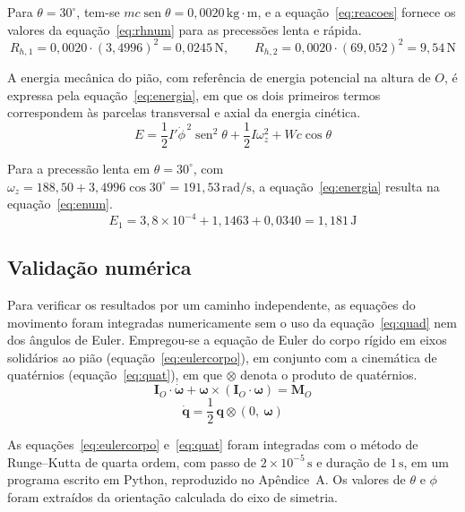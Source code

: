 \documentclass[12pt,a4paper]{article}
\newcommand{\vet}[1]{\mathbf{#1}}
\newcommand{\vomega}{\boldsymbol{\omega}}
\newcommand{\seno}{\operatorname{sen}}
\newcommand{\un}[1]{\,\mathrm{#1}}
\newcommand{\phid}{\dot{\phi}}
\begin{document}
Para $\theta=30^\circ$, tem-se $mc\seno\theta=0,0020\un{kg\cdot m}$, e a equação~\ref{eq:reacoes} fornece os valores da equação~\ref{eq:rhnum} para as precessões lenta e rápida.
\begin{equation}
R_{h,1}=0,0020\cdot(3,4996)^2=0,0245\un{N},
\qquad
R_{h,2}=0,0020\cdot(69,052)^2=9,54\un{N}
\label{eq:rhnum}
\end{equation}

A energia mecânica do pião, com referência de energia potencial na altura de $O$, é expressa pela equação~\ref{eq:energia}, em que os dois primeiros termos correspondem às parcelas transversal e axial da energia cinética.
\begin{equation}
E = \frac{1}{2}I'\phid^{\,2}\seno^2\theta + \frac{1}{2}I\omega_z^2 + Wc\cos\theta
\label{eq:energia}
\end{equation}

Para a precessão lenta em $\theta=30^\circ$, com $\omega_z=188,50+3,4996\cos30^\circ=191,53\un{rad/s}$, a equação~\ref{eq:energia} resulta na equação~\ref{eq:enum}.
\begin{equation}
E_1=3,8\times10^{-4}+1,1463+0,0340=1,181\un{J}
\label{eq:enum}
\end{equation}

\subsection{Validação numérica}

Para verificar os resultados por um caminho independente, as equações do movimento foram integradas numericamente sem o uso da equação~\ref{eq:quad} nem dos ângulos de Euler. Empregou-se a equação de Euler do corpo rígido em eixos solidários ao pião (equação~\ref{eq:eulercorpo}), em conjunto com a cinemática de quatérnios (equação~\ref{eq:quat}), em que $\otimes$ denota o produto de quatérnios.
\begin{equation}
\vet{I}_O\cdot\dot{\vomega} + \vomega\times\left(\vet{I}_O\cdot\vomega\right) = \vet{M}_O
\label{eq:eulercorpo}
\end{equation}
\begin{equation}
\dot{\vet{q}} = \frac{1}{2}\,\vet{q}\otimes\left(0,\ \vomega\right)
\label{eq:quat}
\end{equation}

As equações~\ref{eq:eulercorpo} e~\ref{eq:quat} foram integradas com o método de Runge--Kutta de quarta ordem, com passo de $2\times10^{-5}\un{s}$ e duração de $1\un{s}$, em um programa escrito em Python, reproduzido no Apêndice~A. Os valores de $\theta$ e $\phi$ foram extraídos da orientação calculada do eixo de simetria.
\end{document}
